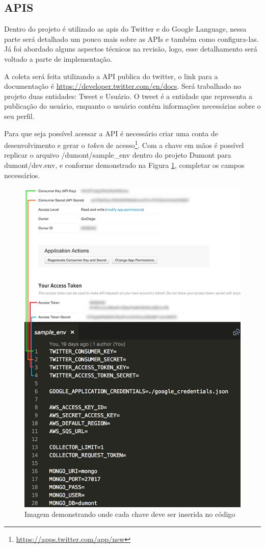 \subsection{APIS}
Dentro do projeto é utilizado as apis do Twitter e do Google Language, nessa parte será detalhado um pouco mais sobre as APIs e também como configura-las. Já foi abordado alguns aspectos técnicos na revisão, logo, esse detalhamento será voltado a parte de implementação.

A coleta será feita utilizando a API publica do twitter, o link para a documentação é \url{https://developer.twitter.com/en/docs}. Será trabalhado no projeto duas entidades: Tweet e Usuário. O tweet é a entidade que representa a publicação do usuário, enquanto o usuário contém informações necessárias sobre o seu perfil.

Para que seja possível acessar a API é necessário criar uma conta de desenvolvimento e gerar o \textit{token} de acesso\footnote{\url{https://apps.twitter.com/app/new}}. Com a chave em mãos é possível replicar o arquivo /dumont/sample\_env dentro do projeto Dumont para dumont/dev.env, e conforme demonstrado na Figura \ref{fig:twitteropts}, completar os campos necessários.

\begin{figure}
    \centering
    \includegraphics[width=.8\textwidth]{imagens/twitteropts.png}
    \caption{Imagem demonstrando onde cada chave deve ser inserida no código}
    \label{fig:twitteropts}
\end{figure}

